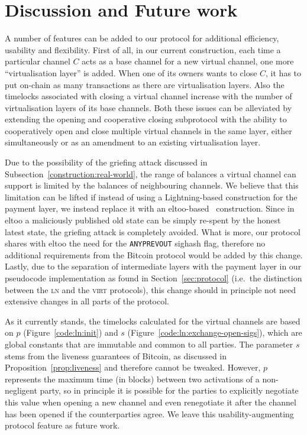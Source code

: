 \section{Discussion and Future work}
  A number of features can be added to our protocol for additional efficiency,
  usability and flexibility. First of all, in our current construction, each
  time a particular channel $C$ acts as a base
  channel for a new virtual channel, one more ``virtualisation layer'' is added. When
  one of its owners wants to close $C$, it has to put on-chain as many
  transactions as there are virtualisation layers. Also the timelocks associated
  with closing a virtual channel increase with the number of virtualisation
  layers of its base channels. Both these issues can be alleviated by extending
  the opening and cooperative closing subprotocol with the ability to
  cooperatively open and close multiple virtual channels in the same layer,
  either simultaneously or as an amendment to an existing virtualisation layer.

  Due to the possibility of the griefing attack discussed in
  Subsection~\ref{construction:real-world}, the range of balances a virtual
  channel can
  support is limited by the balances of neighbouring channels. We believe that
  this limitation can be lifted if instead of using a Lightning-based
  construction for the payment layer, we instead replace it with an
  eltoo-based~\cite{eltoo} construction. Since in eltoo a maliciously published
  old state can be simply re-spent by the honest latest state, the griefing
  attack is completely avoided. What is more, our protocol shares with eltoo the
  need for the \texttt{ANYPREVOUT} sighash flag, therefore no additional
  requirements from the Bitcoin protocol would be added by this change. Lastly,
  due to the separation of intermediate layers with the payment layer in our
  pseudocode implementation as found in Section~\ref{sec:protocol} (i.e.\ the distinction
  between the \textsc{ln} and the \textsc{virt} protocols), this change should
  in principle not need extensive changes in all parts of the protocol.

  As it currently stands, the timelocks calculated for the virtual channels are
  based on $p$ (Figure~\ref{code:ln:init}) and $s$
  (Figure~\ref{code:ln:exchange-open-sigs}),
  which are global constants that are immutable and common to all parties. The 
  parameter $s$
  stems from the liveness guarantees of Bitcoin, as discussed in
  Proposition~\ref{prop:liveness} and therefore cannot be tweaked. However, $p$
  represents the maximum time (in blocks) between two activations of a non-negligent party,
  so in principle it is possible for the parties to explicitly negotiate this
  value when opening a new channel and even renegotiate it after the channel has
  been opened if the counterparties agree. We leave this usability-augmenting
  protocol feature as future work.

